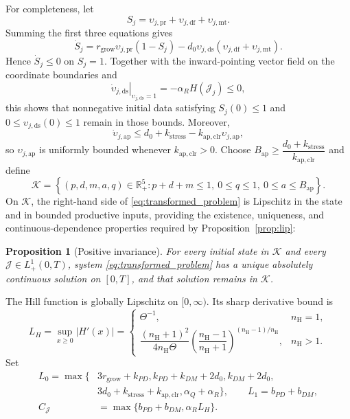 \documentclass[pdflatex,sn-mathphys-num]{sn-jnl}
\numberwithin{equation}{section}
\theoremstyle{thmstyleone}%
\newtheorem{proposition}[theorem]{Proposition}
\theoremstyle{definition}
\theoremstyle{remark}
\begin{document}
For completeness, let
\[
S_j
=
\upsilon_{j,\mathrm{pr}}
+\upsilon_{j,\mathrm{df}}
+\upsilon_{j,\mathrm{mt}}.
\]
Summing the first three equations gives
\begin{equation*}
\dot S_j
=
r_{\mathrm{grow}}\upsilon_{j,\mathrm{pr}}(1-S_j)
-
d_0\upsilon_{j,\mathrm{ds}}
\left(
\upsilon_{j,\mathrm{df}}
+\upsilon_{j,\mathrm{mt}}
\right).
\end{equation*}
Hence $\dot S_j\leq0$ on $S_j=1$. Together with the inward-pointing vector field on the coordinate boundaries and
\[
\left.\dot\upsilon_{j,\mathrm{ds}}\right|_{\upsilon_{j,\mathrm{ds}}=1}
=
-\alpha_RH(\mathcal J_j)\leq0,
\]
this shows that nonnegative initial data satisfying $S_j(0)\leq1$ and $0\leq\upsilon_{j,\mathrm{ds}}(0)\leq1$ remain in those bounds. Moreover,
\[
\dot\upsilon_{j,\mathrm{ap}}
\leq
d_0+k_{\mathrm{stress}}
-k_{\mathrm{ap,clr}}\upsilon_{j,\mathrm{ap}},
\]
so $\upsilon_{j,\mathrm{ap}}$ is uniformly bounded whenever $k_{\mathrm{ap,clr}}>0$.
Choose $B_{\mathrm{ap}}\geq \dfrac{d_0+k_{\mathrm{stress}}}{k_{\mathrm{ap,clr}}}$
and define
\begin{equation*}
\mathcal K=\left\{(p,d,m,a,q)\in\mathbb R_+^5:
p+d+m\leq1,\ 0\leq q\leq1,\ 0\leq a\leq B_{\mathrm{ap}}\right\}.
\label{eq:app_invariant_set}
\end{equation*}
On $\mathcal K$, the right-hand side of \eqref{eq:transformed_problem} is Lipschitz in the state and in bounded productive inputs, providing the existence, uniqueness, and continuous-dependence properties required by Proposition~\ref{prop:lip}:
\begin{proposition}[Positive invariance]
\label{prop:app_positive_invariance}
For every initial state in $\mathcal K$ and every
$\mathcal J\in L^1_+(0,T)$, system \eqref{eq:transformed_problem} has a unique
absolutely continuous solution on $[0,T]$, and that solution remains in
$\mathcal K$.
\end{proposition}

The Hill function is globally Lipschitz on $[0,\infty)$. Its sharp derivative
bound is
\begin{equation}
L_H=\sup_{x\geq0}|H'(x)|=
\begin{cases}
\Theta^{-1},&n_{\mathrm H}=1,\\[2mm]
\dfrac{(n_{\mathrm H}+1)^2}{4n_{\mathrm H}\Theta}
\left(\dfrac{n_{\mathrm H}-1}{n_{\mathrm H}+1}\right)^{
(n_{\mathrm H}-1)/n_{\mathrm H}},&n_{\mathrm H}>1.
\end{cases}
\label{eq:app_Hill_Lipschitz}
\end{equation}
Set
\begin{align}
L_0=\max\{&3r_{\mathrm{grow}}+k_{PD},
k_{PD}+k_{DM}+2d_0,
k_{DM}+2d_0,\nonumber\\
&3d_0+k_{\mathrm{stress}}+k_{\mathrm{ap,clr}},
\alpha_Q+\alpha_R\},\qquad
L_1=b_{PD}+b_{DM},
\label{eq:app_L_constants}\\
C_{\mathcal J}&=\max\{b_{PD}+b_{DM},\alpha_RL_H\}.
\end{align}
\end{document}
